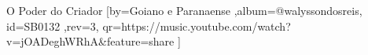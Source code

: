 \beginsong
{O Poder do Criador %
}[by={Goiano e Paranaense %
},album={@walyssondosreis},
id={SB0132 %
},rev={3}, %
qr={https://music.youtube.com/watch?v=jOADeghWRhA&feature=share %
}]

\lstset{basicstyle=\scriptsize\bf} %

